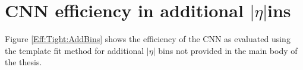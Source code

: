 \section{CNN efficiency in additional \texorpdfstring{$|\eta|$} bins}
Figure \ref{Eff:Tight:AddBins} shows the efficiency of the CNN as evaluated using the template fit method for additional $|\eta|$ bins not provided in the main body of the thesis.
\begin{figure}[htbp]
    \centering
	  \\
	

\end{figure}
